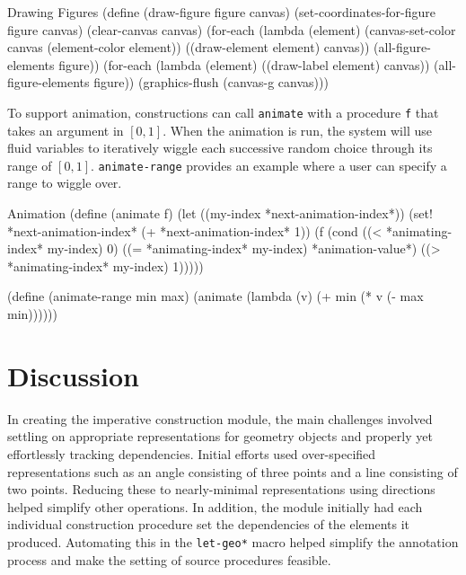 \begin{code-listing}
[label=draw-figure]
{Drawing Figures}
(define (draw-figure figure canvas)
  (set-coordinates-for-figure figure canvas)
  (clear-canvas canvas)
  (for-each
   (lambda (element)
     (canvas-set-color canvas (element-color element))
     ((draw-element element) canvas))
   (all-figure-elements figure))
  (for-each
   (lambda (element)
     ((draw-label element) canvas))
   (all-figure-elements figure))
  (graphics-flush (canvas-g canvas)))
\end{code-listing}

To support animation, constructions can call \texttt{animate} with a
procedure \texttt{f} that takes an argument in $[0, 1]$. When the animation is
run, the system will use fluid variables to iteratively wiggle each
successive random choice through its range of
$[0,1]$. \texttt{animate-range} provides an example where a user can
specify a range to wiggle over.

\enlargethispage*{\baselineskip}

\begin{code-listing}
[label=animation]
{Animation}
(define (animate f)
  (let ((my-index *next-animation-index*))
    (set! *next-animation-index* (+ *next-animation-index* 1))
    (f (cond ((< *animating-index* my-index) 0)
             ((= *animating-index* my-index) *animation-value*)
             ((> *animating-index* my-index) 1)))))

(define (animate-range min max)
  (animate (lambda (v) (+ min (* v (- max min))))))
\end{code-listing}

\section{Discussion}

In creating the imperative construction module, the main challenges
involved settling on appropriate representations for geometry objects
and properly yet effortlessly tracking dependencies. Initial efforts
used over-specified representations such as an angle consisting of
three points and a line consisting of two points. Reducing these to
nearly-minimal representations using directions helped simplify other
operations. In addition, the module initially had each individual
construction procedure set the dependencies of the elements it
produced. Automating this in the \texttt{let-geo*} macro helped
simplify the annotation process and make the setting of source
procedures feasible.

